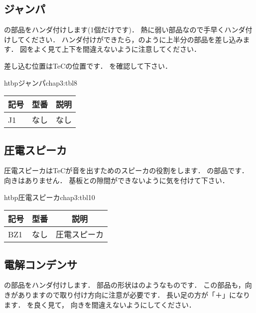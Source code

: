 \subsection{ジャンパ}
の部品をハンダ付けします(1個だけです)．
熱に弱い部品なので手早くハンダ付けしてください．
ハンダ付けができたら，のように上半分の部品を差し込みます．
図をよく見て上下を間違えないように注意してください．

差し込む位置はTeCの位置です．
を確認して下さい．

\begin{mytable}{htbp}{ジャンパ}{chap3:tbl8}
\begin{tabular}{|l|l|l|}
\hline
\multicolumn{1}{|c|}{記号} &
\multicolumn{1}{c|}{型番} &
\multicolumn{1}{c|}{説明} \\
\hline
J1 & なし &  なし \\
\hline
\end{tabular}
\end{mytable}


\newpage
\subsection{圧電スピーカ}
圧電スピーカはTeCが音を出すためのスピーカの役割をします．
の部品です．
向きはありません．
基板との隙間ができないように気を付けて下さい．

\begin{mytable}{htbp}{圧電スピーカ}{chap3:tbl10}
\begin{tabular}{|l|l|l|}
\hline
\multicolumn{1}{|c|}{記号} &
\multicolumn{1}{c|}{型番} &
\multicolumn{1}{c|}{説明} \\
\hline
BZ1 & なし & 圧電スピーカ \\
\hline
\end{tabular}
\end{mytable}


\subsection{電解コンデンサ}
の部品をハンダ付けします．
部品の形状はのようなものです．
この部品も，向きがありますので取り付け方向に注意が必要です．
長い足の方が「＋」になります．
を良く見て，
向きを間違えないようにしてください．

